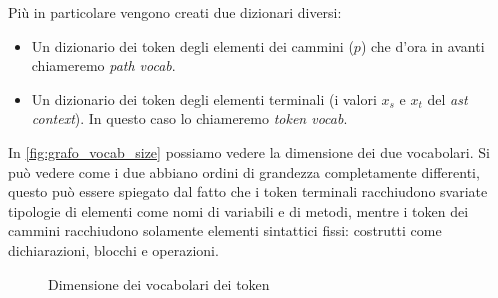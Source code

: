 Più in particolare vengono creati due dizionari diversi:
  \begin{itemize}
    \item Un dizionario dei token degli elementi dei cammini ($p$) che d'ora in avanti chiameremo \textit{path vocab}.
    \item Un dizionario dei token degli elementi terminali (i valori $x_s$ e $x_t$ del \textit{ast context}). In questo caso lo chiameremo \textit{token vocab}.
  \end{itemize}
In \autoref{fig:grafo_vocab_size} possiamo vedere la dimensione dei due vocabolari.
Si può vedere come i due abbiano ordini di grandezza completamente differenti, questo può essere spiegato dal fatto che i token terminali racchiudono svariate tipologie di elementi come nomi di variabili e di metodi,
mentre i token dei cammini racchiudono solamente elementi sintattici fissi: costrutti come dichiarazioni, blocchi e operazioni.

  \begin{figure}
    \centering
    \caption{Dimensione dei vocabolari dei token}
    \label{fig:grafo_vocab_size}
\end{figure}

